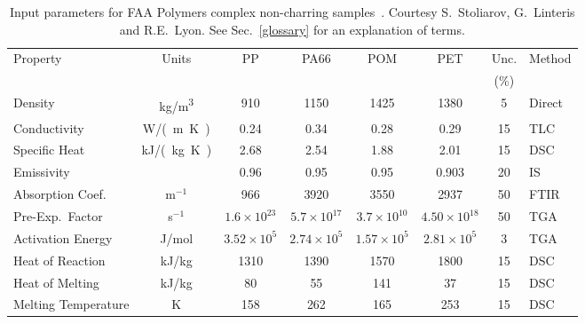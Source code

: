 \begin{table}[h!]
\caption[FAA complex non-charring polymer properties]{Input parameters for FAA Polymers complex non-charring samples~\cite{Stoliarov:FM2012}. Courtesy S.~Stoliarov, G.~Linteris and R.E.~Lyon. See Sec.~\ref{glossary} for an explanation of terms.}
\begin{center}
\begin{tabular}{|l|c|c|c|c|c|c|l|}
\hline
Property                    & Units         & PP                    & PA66                  & POM                   & PET                   & Unc.      & Method    \\
                            &               &                       &                       &                       &                       & (\%)      &           \\ \hline \hline
Density                     & \unit{kg/m^3}      & 910                   & 1150                  & 1425                  & 1380                  & 5         & Direct    \\ \hline
Conductivity                & \unit{W/(m.K)}& 0.24                  & 0.34                  & 0.28                  & 0.29                  & 15        & TLC       \\ \hline
Specific Heat               & \unit{kJ/(kg.K)}       & 2.68                  & 2.54                  & 1.88                  & 2.01                  & 15        & DSC       \\ \hline
Emissivity                  &               & 0.96                  & 0.95                  & 0.95                  & 0.903                 & 20        & IS        \\ \hline
Absorption Coef.            & m$^{-1}$      & 966                   & 3920                  & 3550                  & 2937                  & 50        & FTIR      \\ \hline
Pre-Exp.~Factor             & s$^{-1}$      & $1.6 \times 10^{23}$  & $5.7 \times 10^{17}$  & $3.7 \times 10^{10}$  & $4.50 \times 10^{18}$ & 50        & TGA       \\ \hline
Activation Energy           & J/mol       & $3.52 \times 10^{5}$  & $2.74 \times 10^{5}$  & $1.57 \times 10^{5}$  & $2.81 \times 10^{5}$  & 3         & TGA       \\ \hline
Heat of Reaction            & kJ/kg         & 1310                  & 1390                  & 1570                  & 1800                  & 15        & DSC       \\ \hline
Heat of Melting             & kJ/kg         & 80                    & 55                    & 141                   & 37                    & 15        & DSC       \\ \hline
Melting Temperature         & K             & 158                   & 262                   & 165                   & 253                   & 15        & DSC       \\ \hline

\end{tabular}
\end{center}
\label{FAA_Properties2}
\end{table}



